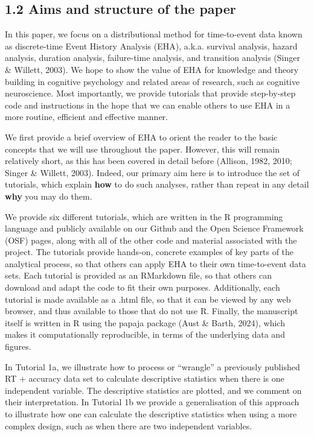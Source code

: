 \documentclass[
  man, donotrepeattitle,floatsintext]{apa6}
\begin{document}
\subsection{1.2 Aims and structure of the paper}\label{aims-and-structure-of-the-paper}

In this paper, we focus on a distributional method for time-to-event data known as discrete-time Event History Analysis (EHA), a.k.a. survival analysis, hazard analysis, duration analysis, failure-time analysis, and transition analysis (Singer \& Willett, 2003). We hope to show the value of EHA for knowledge and theory building in cognitive psychology and related areas of research, such as cognitive neuroscience. Most importantly, we provide tutorials that provide step-by-step code and instructions in the hope that we can enable others to use EHA in a more routine, efficient and effective manner.

We first provide a brief overview of EHA to orient the reader to the basic concepts that we will use throughout the paper. However, this will remain relatively short, as this has been covered in detail before (Allison, 1982, 2010; Singer \& Willett, 2003). Indeed, our primary aim here is to introduce the set of tutorials, which explain \textbf{how} to do such analyses, rather than repeat in any detail \textbf{why} you may do them.

We provide six different tutorials, which are written in the R programming language and publicly available on our Github and the Open Science Framework (OSF) pages, along with all of the other code and material associated with the project. The tutorials provide hands-on, concrete examples of key parts of the analytical process, so that others can apply EHA to their own time-to-event data sets. Each tutorial is provided as an RMarkdown file, so that others can download and adapt the code to fit their own purposes. Additionally, each tutorial is made available as a .html file, so that it can be viewed by any web browser, and thus available to those that do not use R. Finally, the manuscript itself is written in R using the papaja package (Aust \& Barth, 2024), which makes it computationally reproducible, in terms of the underlying data and figures.

In Tutorial 1a, we illustrate how to process or ``wrangle'' a previously published RT + accuracy data set to calculate descriptive statistics when there is one independent variable. The descriptive statistics are plotted, and we comment on their interpretation. In Tutorial 1b we provide a generalisation of this approach to illustrate how one can calculate the descriptive statistics when using a more complex design, such as when there are two independent variables.
\end{document}
